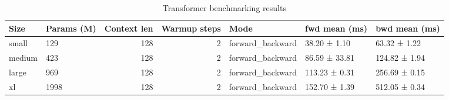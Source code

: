\begin{table}
\caption{Transformer benchmarking results}
\label{tab:benchmarks}
\begin{tabular}{llrrlll}
\toprule
Size & Params (M) & Context len & Warmup steps & Mode & fwd mean (ms) & bwd mean (ms) \\
\midrule
small & 129 & 128 & 2 & forward_backward & 38.20 ± 1.10 & 63.32 ± 1.22 \\
medium & 423 & 128 & 2 & forward_backward & 86.59 ± 33.81 & 124.82 ± 1.94 \\
large & 969 & 128 & 2 & forward_backward & 113.23 ± 0.31 & 256.69 ± 0.15 \\
xl & 1998 & 128 & 2 & forward_backward & 152.70 ± 1.39 & 512.05 ± 0.34 \\
\bottomrule
\end{tabular}
\end{table}
